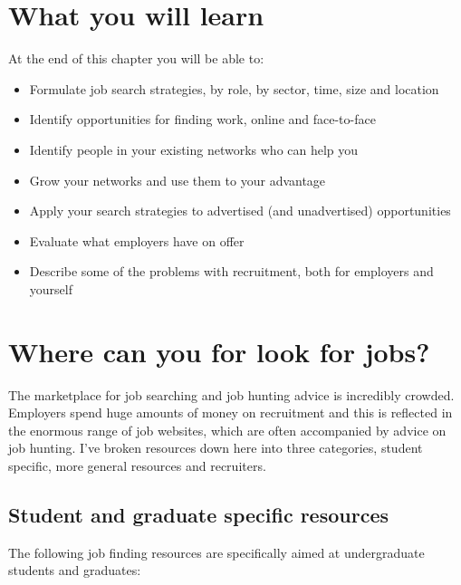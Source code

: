 \documentclass[
]{book}
\providecommand{\tightlist}{%
  \setlength{\itemsep}{0pt}\setlength{\parskip}{0pt}}
\begin{document}
\hypertarget{ilo8}{%
\section{What you will learn}\label{ilo8}}

At the end of this chapter you will be able to:

\begin{itemize}
\tightlist
\item
  Formulate job search strategies, by role, by sector, time, size and location
\item
  Identify opportunities for finding work, online and face-to-face
\item
  Identify people in your existing networks who can help you
\item
  Grow your networks and use them to your advantage
\item
  Apply your search strategies to advertised (and unadvertised) opportunities
\item
  Evaluate what employers have on offer
\item
  Describe some of the problems with recruitment, both for employers and yourself
\end{itemize}

\hypertarget{looking}{%
\section{Where can you for look for jobs?}\label{looking}}

The marketplace for job searching and job hunting advice is incredibly crowded. Employers spend huge amounts of money on recruitment and this is reflected in the enormous range of job websites, which are often accompanied by advice on job hunting. I've broken resources down here into three categories, student specific, more general resources and recruiters.

\hypertarget{studentjobs}{%
\subsection{Student and graduate specific resources}\label{studentjobs}}

The following job finding resources are specifically aimed at undergraduate students and graduates:
\end{document}

